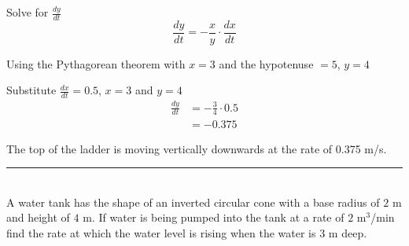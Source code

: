 Solve for $\frac{d y}{d t}$
\begin{equation*}\frac{d y}{d t} = -\frac{x}{y} \cdot \frac{d x}{d t}
\end{equation*}

Using the Pythagorean theorem with $x=3$ and the hypotenuse $=5$, $y=4$

Substitute $\frac{d x}{d t} =0.5$, $x =3$ and $y =4$
\begin{align*}\frac{d y}{d t} &  =  -\frac{3}{4} \cdot 0.5 \\
 &  =  -0.375\end{align*}

The top of the ladder is moving vertically downwards at the rate of 0.375 m/s.\\
\rule{6.8cm}{0.5pt}\\
\example A water tank has the shape of an inverted circular cone with a base radius of $2$ $\mbox{m}$ and height of $4$ $\mbox{m}$. If water is being pumped into
the tank at a rate of $2$ $\mathrm{m}^{3}$/$\mbox{min}$ find the rate at which the water level is rising when the water is $3$ $\mbox{m}$ deep.

